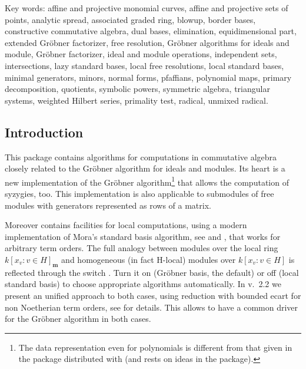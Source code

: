 
\newcommand{\ind}[1]{\emph{#1}\index{#1!Cali package@\textsc{Cali} package}}
\newcommand{\indf}[2]{\f{#1}\ttindextype[CALI]{#1}{#2}}
\newcommand{\indid}[1]{\texttt{#1}\ttindextype[CALI]{#1}{symbol}}
\newcommand{\indsw}[1]{\sw{#1}\ttindexswitch[CALI]{#1}}
\newcommand{\calipbx}[1]{\mbox{}\hfill \parbox[t]{12cm}{#1} \pagebreak[3]}

Key words:
affine and projective monomial curves,
affine and projective sets of points,
analytic spread,
associated graded ring,
blowup,
border bases,
constructive commutative algebra,
dual bases,
elimination,
equidimensional part,
extended Gr\"obner factorizer,
free resolution,
Gr\"obner algorithms for ideals and module,
Gr\"obner factorizer,
ideal and module operations,
independent sets,
intersections,
lazy standard bases,
local free resolutions,
local standard bases,
minimal generators,
minors,
normal forms,
pfaffians,
polynomial maps,
primary decomposition,
quotients,
symbolic powers,
symmetric algebra,
triangular systems,
weighted Hilbert series,
primality test,
radical,
unmixed radical.


\subsection{Introduction}

This package contains algorithms for computations in commutative
algebra closely related to the Gr\"obner algorithm for ideals and modules.
Its heart is a new implementation of the Gr\"obner algorithm\footnote{The
data representation even for polynomials is different from that given
in the  package distributed with \REDUCE (and rests on ideas
 in the  package).} that allows the computation of
syzygies, too. This implementation is also applicable to submodules of
free modules with generators represented as rows of a matrix.

Moreover  contains facilities for local computations, using a
modern implementation of Mora's standard basis algorithm, see
\cite{MoraPfisterTraverso:92} and \cite{Graebe:94}, that works for arbitrary term orders.
The full analogy between modules over the local ring \linebreak[1]
$k[x_v:v\in H]_{\mathbf{m}}$ and homogeneous (in fact H-local) modules
over $k[x_v:v\in H]$ is reflected through the switch
.
Turn it on (Gr\"obner basis, the default) or off (local
standard basis) to choose appropriate algorithms
automatically. In v.~2.2 we present an unified approach to both
cases, using reduction with bounded ecart for non Noetherian term
orders, see \cite{Graebe:95a} for details. This allows to have a common
driver for the Gr\"obner algorithm in both cases.

